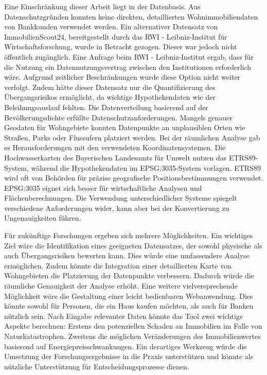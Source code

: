 Eine Einschränkung dieser Arbeit liegt in der Datenbasis. Aus Datenschutzgründen konnten keine direkten, detaillierten Wohnimmobiliendaten von Bankkunden verwendet werden. Ein alternativer Datensatz von ImmobilienScout24, bereitgestellt durch das RWI - Leibniz-Institut für Wirtschaftsforschung, wurde in Betracht gezogen. Dieser war jedoch nicht öffentlich zugänglich. Eine Anfrage beim RWI - Leibniz-Institut ergab, dass für die Nutzung ein Datennutzungsvertrag zwischen den Institutionen erforderlich wäre. Aufgrund zeitlicher Beschränkungen wurde diese Option nicht weiter verfolgt.
Zudem hätte dieser Datensatz nur die Quantifizierung des Übergangsrisikos ermöglicht, da wichtige Hypothekendaten wie der Beleihungsauslauf fehlten. Die Datenverteilung basierend auf der Bevölkerungsdichte erfüllte Datenschutzanforderungen. Mangels genauer Geodaten für Wohngebiete konnten Datenpunkte an unplausiblen Orten wie Straßen, Parks oder Flussufern platziert werden.
Bei der räumlichen Analyse gab es Herausforderungen mit den verwendeten Koordinatensystemen. Die Hochwasserkarten des Bayerischen Landesamts für Umwelt nutzen das ETRS89-System, während die Hypothekendaten im EPSG:3035-System vorlagen. ETRS89 wird oft von Behörden für präzise geografische Positionsbestimmungen verwendet. EPSG:3035 eignet sich besser für wirtschaftliche Analysen und Flächenberechnungen. Die Verwendung unterschiedlicher Systeme spiegelt verschiedene Anforderungen wider, kann aber bei der Konvertierung zu Ungenauigkeiten führen.

Für zukünftige Forschungen ergeben sich mehrere Möglichkeiten. Ein wichtiges Ziel wäre die Identifikation eines geeigneten Datensatzes, der sowohl physische als auch Übergangsrisiken bewerten kann. Dies würde eine umfassendere Analyse ermöglichen. Zudem könnte die Integration einer detaillierten Karte von Wohngebieten die Platzierung der Datenpunkte verbessern. Dadurch würde die räumliche Genauigkeit der Analyse erhöht. Eine weitere vielversprechende Möglichkeit wäre die Gestaltung einer leicht bedienbaren Webanwendung. Dies könnte sowohl für Personen, die ein Haus kaufen möchten, als auch für Banken nützlich sein. Nach Eingabe relevanter Daten könnte das Tool zwei wichtige Aspekte berechnen: Erstens den potenziellen Schaden an Immobilien im Falle von Naturkatastrophen. Zweitens die möglichen Veränderungen des Immobilienwertes basierend auf Energiepreisschwankungen. Ein derartiges Werkzeug würde die Umsetzung der Forschungsergebnisse in die Praxis unterstützen und könnte als nützliche Unterstützung für Entscheidungsprozesse dienen.
